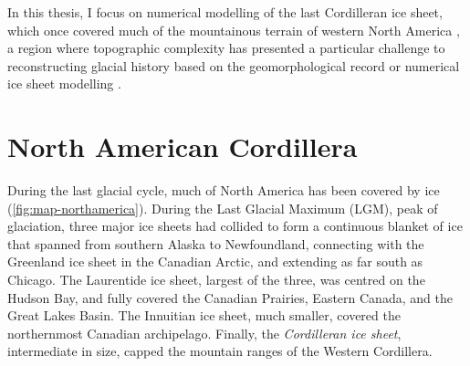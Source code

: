 \documentclass[a4paper]{kappa}
\begin{document}
In this thesis, I focus on numerical modelling of the last Cordilleran ice
sheet, which once covered much of the mountainous terrain of western North
America \citep{Dawson.1888}, a region where topographic complexity has
presented a particular challenge to reconstructing glacial history based on the
geomorphological record \citep[e.g.,][]{Kleman.etal.2010} or numerical ice
sheet modelling \citep[e.g.,][]{Robert.1991}.


\section{North American Cordillera}

During the last glacial cycle, much of North America has been covered by ice
(\cref{fig:map-northamerica}). During the Last Glacial Maximum (LGM), peak of
glaciation, three major ice sheets had collided to
form a continuous blanket of ice that spanned from southern Alaska to
Newfoundland, connecting with the Greenland ice sheet in the Canadian Arctic,
and extending as far south as Chicago.
The Laurentide ice sheet, largest of the three, was centred on the Hudson Bay,
and fully covered the Canadian Prairies, Eastern Canada, and the Great Lakes
Basin. The Innuitian ice sheet, much smaller, covered the northernmost Canadian
archipelago. Finally, the \emph{Cordilleran ice sheet}, intermediate in size,
capped the mountain
ranges of the Western Cordillera.
\end{document}
